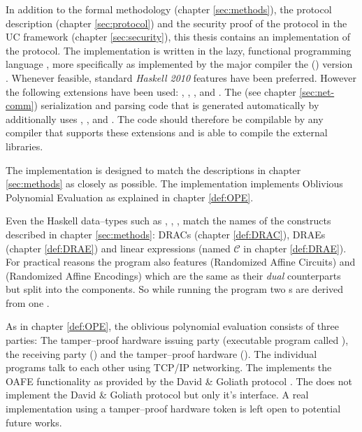 \label{sec:implementation}

In addition to the formal methodology (chapter \ref{sec:methods}), the protocol
description (chapter \ref{sec:protocol}) and the security proof of the protocol
in the UC framework (chapter \ref{sec:security}), this thesis contains an
implementation of the protocol. The implementation is written in the lazy,
functional programming language \JWTLhaskell{}, more specifically \JWThaskell{}
as implemented by the major \JWThaskell{} compiler the \JWTXLghc{} (\JWTghc{})
version \JWTVghc{}. Whenever feasible, standard \emph{Haskell 2010}
\cite{haskell2010} features have been preferred. However the following
extensions have been used: ,
, , and
.  The \JWTprotobuf{} (see chapter
\ref{sec:net-comm}) serialization and parsing code that is generated
automatically by  additionally uses
, , and
. The code should therefore be compilable
by any \JWThaskell{} compiler that supports these extensions and is able to
compile the external libraries.

The implementation is designed to match the descriptions in chapter
\ref{sec:methods} as closely as possible. The implementation implements
Oblivious Polynomial Evaluation as explained in chapter \ref{def:OPE}.

Even the Haskell data--types such as , , ,
 match the names of the constructs described in chapter
\ref{sec:methods}: DRACs (chapter \ref{def:DRAC}), DRAEs (chapter
\ref{def:DRAE}) and linear expressions (named $\mathcal{C}$ in chapter
\ref{def:DRAE}). For practical reasons the program also features 
(Randomized Affine Circuits) and  (Randomized Affine Encodings)
which are the same as their \emph{dual} counterparts but split into the
components. So while running the program two s are derived from one
.

As in chapter \ref{def:OPE}, the oblivious polynomial evaluation consists of
three parties: The tamper--proof hardware issuing party \JWpOne{} (executable
program called \JWBpOne{}), the receiving party \JWpTwo{} (\JWBpTwo{}) and the
tamper--proof hardware \JWtoken{} (\JWBtoken{}). The individual programs talk to
each other using TCP/IP networking. The \JWtoken{} implements the OAFE
functionality  as provided by the David \& Goliath
protocol \cite{davidgoliath}. The \JWtoken{} does not implement the
David \& Goliath protocol but only it's interface. A real implementation using a
tamper--proof hardware token is left open to potential future works.


